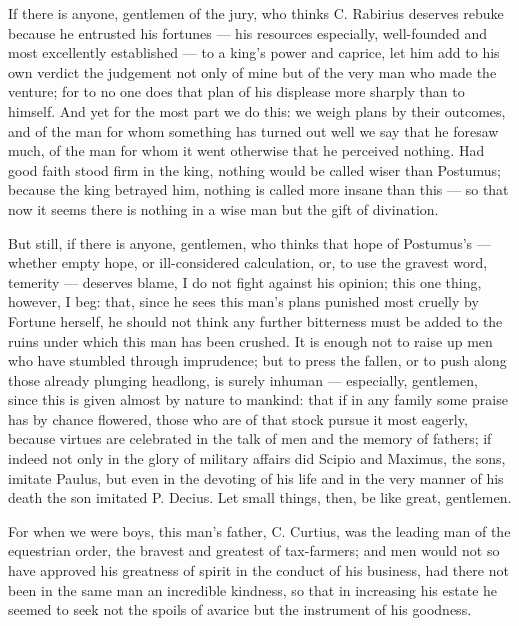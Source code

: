 
 If there is anyone, gentlemen of the jury, who thinks C. Rabirius deserves rebuke because he entrusted his fortunes --- his resources especially, well-founded and most excellently established --- to a king's power and caprice, let him add to his own verdict the judgement not only of mine but of the very man who made the venture; for to no one does that plan of his displease more sharply than to himself. And yet for the most part we do this: we weigh plans by their outcomes, and of the man for whom something has turned out well we say that he foresaw much, of the man for whom it went otherwise that he perceived nothing. Had good faith stood firm in the king, nothing would be called wiser than Postumus; because the king betrayed him, nothing is called more insane than this --- so that now it seems there is nothing in a wise man but the gift of divination.

 But still, if there is anyone, gentlemen, who thinks that hope of Postumus's --- whether empty hope, or ill-considered calculation, or, to use the gravest word, temerity --- deserves blame, I do not fight against his opinion; this one thing, however, I beg: that, since he sees this man's plans punished most cruelly by Fortune herself, he should not think any further bitterness must be added to the ruins under which this man has been crushed. It is enough not to raise up men who have stumbled through imprudence; but to press the fallen, or to push along those already plunging headlong, is surely inhuman --- especially, gentlemen, since this is given almost by nature to mankind: that if in any family some praise has by chance flowered, those who are of that stock pursue it most eagerly, because virtues are celebrated in the talk of men and the memory of fathers; if indeed not only in the glory of military affairs did Scipio and Maximus, the sons, imitate Paulus, but even in the devoting of his life and in the very manner of his death the son imitated P. Decius. Let small things, then, be like great, gentlemen.

 For when we were boys, this man's father, C. Curtius, was the leading man of the equestrian order, the bravest and greatest of tax-farmers; and men would not so have approved his greatness of spirit in the conduct of his business, had there not been in the same man an incredible kindness, so that in increasing his estate he seemed to seek not the spoils of avarice but the instrument of his goodness.

